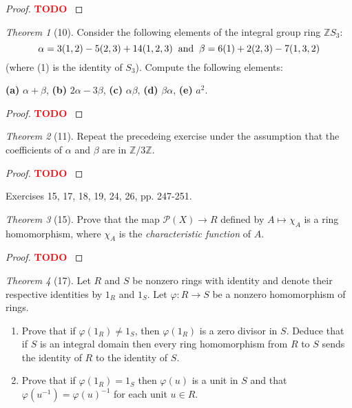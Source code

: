 \documentclass[12pt]{article}
\theoremstyle{remark}
\theoremstyle{named}
\newtheorem*{theorem}{Theorem}
\newcommand{\todo}{\textcolor{red}{\textbf{TODO} }}
\renewcommand{\a}{\alpha}
\renewcommand{\b}{\beta}
\newcommand{\Z}{\mathbb Z}
\begin{document}
\begin{proof}
    \todo
\end{proof}

\begin{theorem}[10]
    Consider the following elements of the integral group ring \(\Z S_3\):
    \[\a = 3(1, 2) - 5(2, 3) + 14(1, 2, 3) \hspace{2mm} \text{and} \hspace{2mm} \b = 6(1) + 2(2, 3) - 7(1, 3, 2)\]
    (where (1) is the identity of \(S_3\)). Compute the following elements:

    \textbf{(a)} \(\a + \b\), \textbf{(b)} \(2\a - 3\b\), \textbf{(c)} \(\a \b\), \textbf{(d)} \(\b\a\), \textbf{(e)} \(a^2\).
\end{theorem}

\begin{proof}
    \todo
\end{proof}

\begin{theorem}[11]
    Repeat the precedeing exercise under the assumption that the coefficients of \(\a\) and \(\b\) are in \(\Z / 3\Z\).
\end{theorem}

\begin{proof}
    \todo
\end{proof}

Exercises 15, 17, 18, 19, 24, 26, pp. 247-251.

\begin{theorem}[15]
    Prove that the map \(\mathcal P(X) \to R\) defined by \(A \mapsto \chi_A\) is a ring homomorphism, where \(\chi_A\) is the \textit{characteristic function} of \(A\). 
\end{theorem}

\begin{proof}
    \todo 
\end{proof}

\begin{theorem}[17]
    Let \(R\) and \(S\) be nonzero rings with identity and denote their respective identities by \(1_R\) and \(1_S\). Let \(\varphi : R \to S\) be a nonzero homomorphism of rings. 
    \begin{enumerate}
        \item Prove that if \(\varphi(1_R) \neq 1_S\), then \(\varphi(1_R)\) is a zero divisor in \(S\). Deduce that if \(S\) is an integral domain then every ring homomorphism from \(R\) to \(S\) sends the identity of \(R\) to the identity of \(S\). 
        \item Prove that if \(\varphi(1_R) = 1_S\) then \(\varphi(u)\) is a unit in \(S\) and that \(\varphi(u^{-1}) = \varphi(u)^{-1}\) for each unit \(u \in R\). 
    \end{enumerate}
\end{theorem}
\end{document}
